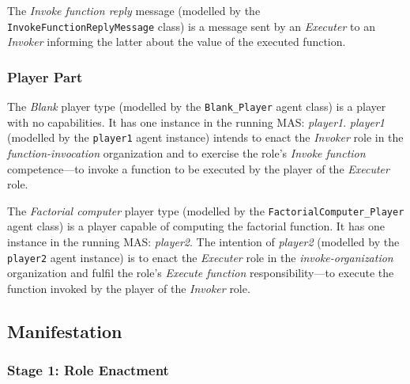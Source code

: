 The \textit{Invoke function reply} message (modelled by the \texttt{InvokeFunctionReplyMessage} class) is a message sent by an \textit{Executer} to an \textit{Invoker} informing the latter about the value of the executed function.

\subsubsection*{Player Part}

The \textit{Blank} player type (modelled by the \texttt{Blank\_Player} agent class) is a player with no capabilities.
It has one instance in the running MAS: \textit{player1}.
\textit{player1} (modelled by the \texttt{player1} agent instance) intends to enact the \textit{Invoker} role in the \textit{function-invocation} organization and to exercise the role's \textit{Invoke function} competence---to invoke a function to be executed by the player of the \textit{Executer} role.

The \textit{Factorial computer} player type (modelled by the \texttt{FactorialComputer\_Player} agent class) is a player capable of computing the factorial function.
It has one instance in the running MAS: \textit{player2}.
The intention of \textit{player2} (modelled by the \texttt{player2} agent instance) is to enact the \textit{Executer} role in the \textit{invoke-organization} organization and fulfil the role's \textit{Execute function} responsibility---to execute the function invoked by the player of the \textit{Invoker} role.

\subsection*{Manifestation}

\subsubsection*{Stage 1: Role Enactment}

